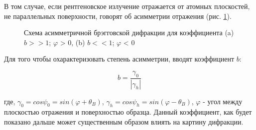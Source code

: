 В том случае, если рентгеновское излучение отражается от атомных плоскостей, не
 параллельных поверхности, говорят об асимметрии отражения (рис. \ref{ris:assymetric_brag}).

\begin{figure}[h]
  \centering
  \hfill
  \caption{Схема асимметричной брэгговской дифракции для коэффициента (a) $b >> 1$; $\varphi$ > 0,
  (b) $b << 1$; $\varphi$ < 0 }
  \label{ris:assymetric_brag}
\end{figure}

Для того чтобы охарактеризовать степень асимметрии, вводят коэффициент $b$:

\begin{equation}
  b = \frac {\gamma_0}{|\gamma_h|}
  \label{eq:koef_b}
 \end{equation}

\noindent
где, $\gamma_0 = cos \psi_0 = sin ( \varphi + \theta_B)$, $\gamma_h = cos \psi_h = sin ( \varphi - \theta_B)$,
$\varphi$ - угол между плоскостью отражения и поверхностью образца. Данный коэффициент, как будет показано дальше
может существенным образом влиять на картину дифракции.
